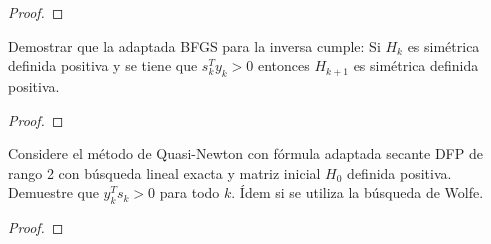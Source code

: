 \documentclass{article}
\newenvironment{theorem}[2][Ejercicio]{\begin{trivlist}
\item[\hskip \labelsep {\bfseries #1}\hskip \labelsep {\bfseries #2.}]}{\end{trivlist}}
\begin{document}
\begin{proof}

\end{proof}
\vspace{0.25in}

\begin{theorem}{8}
    Demostrar que la adaptada BFGS para la inversa cumple:
    Si \(H_k\) es simétrica definida positiva y se tiene que \(s_k^T y_k > 0\)
    entonces \(H_{k+1}\) es simétrica definida positiva.
\end{theorem}

\begin{proof}

\end{proof}
\vspace{0.25in}

\begin{theorem}{9}
    Considere el método de Quasi-Newton con fórmula adaptada secante DFP de rango 2
    con búsqueda lineal exacta y matriz inicial \(H_0\) definida positiva.
    Demuestre que \(y_k^T s_k > 0\) para todo \(k\).
    Ídem si se utiliza la búsqueda de Wolfe.
\end{theorem}

\begin{proof}

\end{proof}
\vspace{0.25in}
\end{document}
